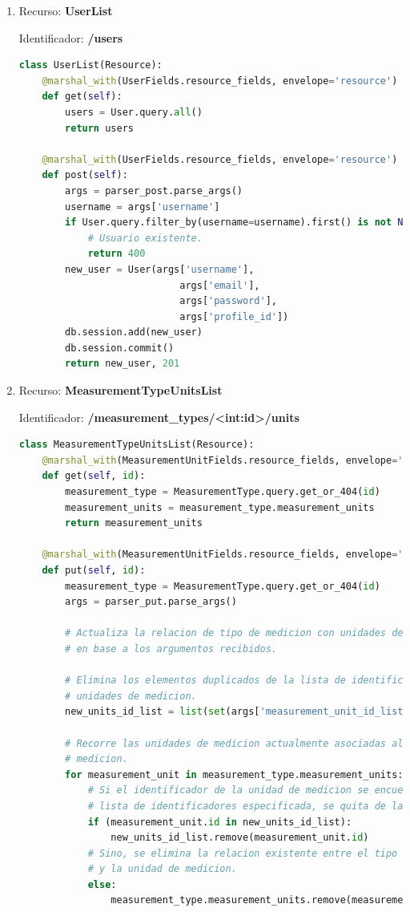 \begin{enumerate}
\item Recurso: \textbf{UserList}

Identificador: \textbf{/users}

\begin{lstlisting}[language=Python]
class UserList(Resource):
    @marshal_with(UserFields.resource_fields, envelope='resource')
    def get(self):
        users = User.query.all()
        return users

    @marshal_with(UserFields.resource_fields, envelope='resource')
    def post(self):
        args = parser_post.parse_args()
        username = args['username']
        if User.query.filter_by(username=username).first() is not None:
            # Usuario existente.
            return 400
        new_user = User(args['username'],
                            args['email'],
                            args['password'],
                            args['profile_id'])
        db.session.add(new_user)
        db.session.commit()
        return new_user, 201
\end{lstlisting}

\item Recurso: \textbf{MeasurementTypeUnitsList}

Identificador: \textbf{/measurement\_types/<int:id>/units}

\begin{lstlisting}[language=Python]
class MeasurementTypeUnitsList(Resource):
    @marshal_with(MeasurementUnitFields.resource_fields, envelope='resource')
    def get(self, id):
        measurement_type = MeasurementType.query.get_or_404(id)
        measurement_units = measurement_type.measurement_units
        return measurement_units

    @marshal_with(MeasurementUnitFields.resource_fields, envelope='resource')
    def put(self, id):
        measurement_type = MeasurementType.query.get_or_404(id)
        args = parser_put.parse_args()

        # Actualiza la relacion de tipo de medicion con unidades de medicion,
        # en base a los argumentos recibidos.

        # Elimina los elementos duplicados de la lista de identificadores de
        # unidades de medicion.
        new_units_id_list = list(set(args['measurement_unit_id_list']))

        # Recorre las unidades de medicion actualmente asociadas al tipo de
        # medicion.
        for measurement_unit in measurement_type.measurement_units:
            # Si el identificador de la unidad de medicion se encuentra en la
            # lista de identificadores especificada, se quita de la misma.
            if (measurement_unit.id in new_units_id_list):
                new_units_id_list.remove(measurement_unit.id)
            # Sino, se elimina la relacion existente entre el tipo de medicion
            # y la unidad de medicion.
            else:
                measurement_type.measurement_units.remove(measurement_unit)


\end{lstlisting}
\end{enumerate}
